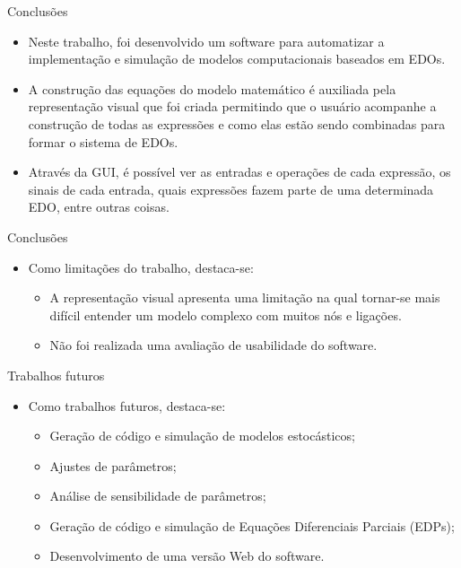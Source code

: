 \begin{frame}{Conclusões}
    \begin{itemize}
        \item Neste trabalho, foi desenvolvido um software para automatizar a implementação e simulação de modelos computacionais baseados em EDOs.
        \item A construção das equações do modelo matemático é auxiliada pela representação visual que foi criada permitindo que o usuário acompanhe a construção de todas as expressões e como elas estão sendo combinadas para formar o sistema de EDOs.
        \item Através da GUI, é possível ver as entradas e operações de cada expressão, os sinais de cada entrada, quais expressões fazem parte de uma determinada EDO, entre outras coisas. 
    \end{itemize}
\end{frame}

\begin{frame}{Conclusões}
    \begin{itemize}
        \item Como limitações do trabalho, destaca-se: 
        \begin{itemize}
            \item A representação visual apresenta uma limitação na qual tornar-se mais difícil entender um modelo complexo com muitos nós e ligações. 
            \item Não foi realizada uma avaliação de usabilidade do software. 
        \end{itemize}
    \end{itemize}
\end{frame}

\begin{frame}{Trabalhos futuros}
    \begin{itemize}
        \item Como trabalhos futuros, destaca-se: 
        \begin{itemize}
            \item Geração de código e simulação de modelos estocásticos;
            \item Ajustes de parâmetros; 
            \item Análise de sensibilidade de parâmetros;
            \item Geração de código e simulação de Equações Diferenciais Parciais (EDPs);
            \item Desenvolvimento de uma versão Web do software.
        \end{itemize}
    \end{itemize}
\end{frame}